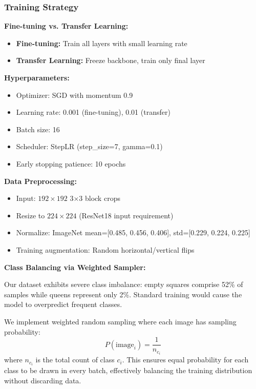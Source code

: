 \documentclass[conference]{IEEEtran}
\begin{document}
\subsubsection{Training Strategy}

\textbf{Fine-tuning vs. Transfer Learning:}
\begin{itemize}
    \item \textbf{Fine-tuning:} Train all layers with small learning rate
    \item \textbf{Transfer Learning:} Freeze backbone, train only final layer
\end{itemize}

\textbf{Hyperparameters:}
\begin{itemize}
    \item Optimizer: SGD with momentum 0.9
    \item Learning rate: 0.001 (fine-tuning), 0.01 (transfer)
    \item Batch size: 16
    \item Scheduler: StepLR (step\_size=7, gamma=0.1)
    \item Early stopping patience: 10 epochs
\end{itemize}

\textbf{Data Preprocessing:}
\begin{itemize}
    \item Input: $192 \times 192$ 3×3 block crops
    \item Resize to $224 \times 224$ (ResNet18 input requirement)
    \item Normalize: ImageNet mean=[0.485, 0.456, 0.406], std=[0.229, 0.224, 0.225]
    \item Training augmentation: Random horizontal/vertical flips
\end{itemize}

\textbf{Class Balancing via Weighted Sampler:}

Our dataset exhibits severe class imbalance: empty squares comprise 52\% of samples while queens represent only 2\%. Standard training would cause the model to overpredict frequent classes.

We implement weighted random sampling where each image has sampling probability:
\begin{equation}
    P(\text{image}_i) = \frac{1}{n_{c_i}}
\end{equation}
where $n_{c_i}$ is the total count of class $c_i$. This ensures equal probability for each class to be drawn in every batch, effectively balancing the training distribution without discarding data.
\end{document}
